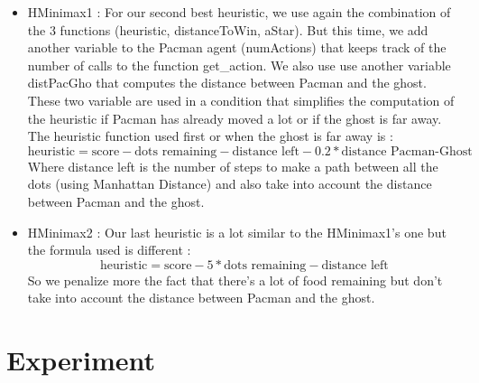 \documentclass{article}
\begin{document}
\begin{enumerate}[label=\alph*.,leftmargin=*]
\begin{itemize}
        \item HMinimax1 : For our second best heuristic, we use again the combination of the 3 functions (heuristic, distanceToWin, aStar). But this time, we add another variable to the Pacman agent (numActions) that keeps track of the number of calls to the function get\_action. We also use
        use another variable distPacGho that computes the distance between Pacman and the ghost. These two variable are used in a condition that simplifies the computation of the heuristic if Pacman has already moved a lot or if the ghost is far away. The heuristic function used first or when the ghost is far away is :
        \begin{equation*}
            \text{heuristic} = \text{score} - \text{dots remaining} - \text{distance left} - 0.2 * \text{distance Pacman-Ghost}
        \end{equation*}
        Where distance left is the number of steps to make a path between all the dots (using Manhattan Distance) and also take into account the distance between Pacman and the ghost.
        \item HMinimax2 : Our last heuristic is a lot similar to the HMinimax1's one but the formula used is different :
        \begin{equation*}
            \text{heuristic} = \text{score} - 5 * \text{dots remaining} - \text{distance left}
        \end{equation*}
        So we penalize more the fact that there's a lot of food remaining but don't take into account the distance between Pacman and the ghost.
    \end{itemize}
\end{enumerate}

\newpage
\section{Experiment}
\end{document}
